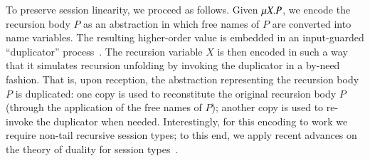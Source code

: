 To preserve session linearity, we proceed as follows.
Given $\mu X. P$, 
we encode the recursion body $P$ as an abstraction
in which free names of $P$ are converted into name variables.
The resulting higher-order value is embedded in an input-guarded 
``duplicator'' process~\cite{ThomsenB:plachoasgcfhop}.
The recursion variable $X$ is then encoded 
in such a way that it
simulates recursion unfolding by 
invoking the duplicator in a by-need fashion.
That is, upon reception, the abstraction representing the 
recursion body $P$
is duplicated: 
one copy is used to reconstitute the original recursion body $P$ (through
the application of the free names of $P$); 
another copy is used to re-invoke the duplicator when needed. 
Interestingly, for this encoding to work 
we require non-tail recursive session types; to this end, 
we apply recent advances on the theory of duality for session types~\cite{TGC14,DBLP:journals/corr/abs-1202-2086}.

%

